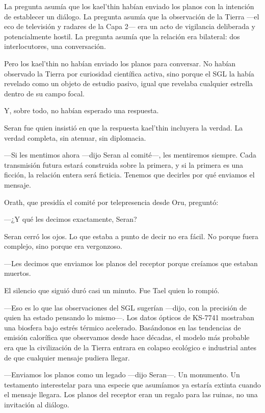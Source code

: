 \documentclass[11pt,a5paper,twoside]{book}
\begin{document}
La pregunta asumía que los kael'thin habían enviado los planos con la intención de establecer un diálogo. La pregunta asumía que la observación de la Tierra —el eco de televisión y radares de la Capa 2— era un acto de vigilancia deliberada y potencialmente hostil. La pregunta asumía que la relación era bilateral: dos interlocutores, una conversación.

Pero los kael'thin no habían enviado los planos para conversar. No habían observado la Tierra por curiosidad científica activa, sino porque el SGL la había revelado como un objeto de estudio pasivo, igual que revelaba cualquier estrella dentro de su campo focal.

Y, sobre todo, no habían esperado una respuesta.

Seran fue quien insistió en que la respuesta kael'thin incluyera la verdad. La verdad completa, sin atenuar, sin diplomacia.

—Si les mentimos ahora —dijo Seran al comité—, les mentiremos siempre. Cada transmisión futura estará construida sobre la primera, y si la primera es una ficción, la relación entera será ficticia. Tenemos que decirles por qué enviamos el mensaje.

Orath, que presidía el comité por telepresencia desde Oru, preguntó:

—¿Y qué les decimos exactamente, Seran?

Seran cerró los ojos. Lo que estaba a punto de decir no era fácil. No porque fuera complejo, sino porque era vergonzoso.

—Les decimos que enviamos los planos del receptor porque creíamos que estaban muertos.

El silencio que siguió duró casi un minuto. Fue Tael quien lo rompió.

—Eso es lo que las observaciones del SGL sugerían —dijo, con la precisión de quien ha estado pensando lo mismo—. Los datos ópticos de KS-7741 mostraban una biosfera bajo estrés térmico acelerado. Basándonos en las tendencias de emisión calorífica que observamos desde hace décadas, el modelo más probable era que la civilización de la Tierra entrara en colapso ecológico e industrial antes de que cualquier mensaje pudiera llegar.

—Enviamos los planos como un legado —dijo Seran—. Un monumento. Un testamento interestelar para una especie que asumíamos ya estaría extinta cuando el mensaje llegara. Los planos del receptor eran un regalo para las ruinas, no una invitación al diálogo.
\end{document}
